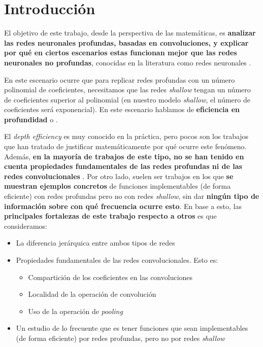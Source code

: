 \chapter{Introducción}\label{ch:introduccion}

El objetivo de este trabajo, desde la perspectiva de las matemáticas, es \textbf{analizar las redes neuronales profundas, basadas en convoluciones, y explicar por qué en ciertos escenarios estas funcionan mejor que las redes neuronales no profundas}, conocidas en la literatura como redes neuronales .

En este escenario ocurre que para replicar redes profundas con un número polinomial de coeficientes, necesitamos que las redes \textit{shallow} tengan un número de coeficientes superior al polinomial (en nuestro modelo \textit{shallow}, el número de coeficientes será exponencial). En este escenario hablamos de \textbf{eficiencia en profundidad} o \textbf{}.

El \textit{depth efficiency} es muy conocido en la práctica, pero pocos son los trabajos que han tratado de justificar matemáticamente por qué ocurre este fenómeno. Además, \textbf{en la mayoría de trabajos de este tipo, no se han tenido en cuenta propiedades fundamentales de las redes profundas ni de las redes convolucionales} \cite{matematicas:paper_depth_malo_01} \cite{matematicas:paper_depth_malo_02} \cite{matematicas:paper_depth_malo_03}. Por otro lado, suelen ser trabajos en los que \textbf{se muestran ejemplos concretos} de funciones implementables (de forma eficiente) con redes profundas pero no con redes \textit{shallow}, sin dar \textbf{ningún tipo de información sobre con qué frecuencia ocurre esto}. En base a esto, las \textbf{principales fortalezas de este trabajo respecto a otros} es que consideramos:

\begin{itemize}
    \item La diferencia jerárquica entre ambos tipos de redes
    \item Propiedades fundamentales de las redes convolucionales. Esto es:
        \begin{itemize}
            \item Compartición de los coeficientes en las convoluciones
            \item Localidad de la operación de convolución
            \item Uso de la operación de \textit{pooling}
        \end{itemize}
    \item Un estudio de lo frecuente que es tener funciones que sean implementables (de forma eficiente) por redes profundas, pero no por redes \textit{shallow}
\end{itemize}

